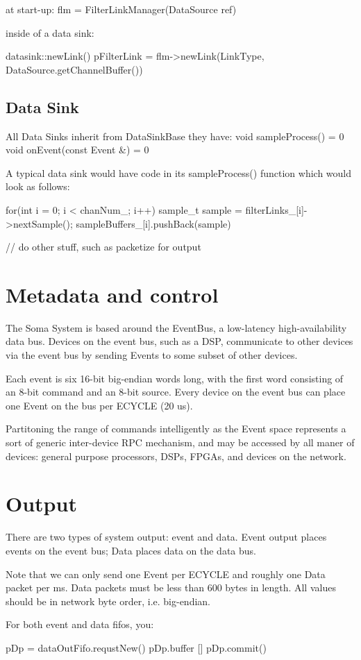 at start-up:
  flm = FilterLinkManager(DataSource ref) 
  
inside of a data sink: 

datasink::newLink()
   pFilterLink = flm->newLink(LinkType, DataSource.getChannelBuffer())


\subsection{Data Sink}
All Data Sinks inherit from DataSinkBase
they have: 
  void sampleProcess() = 0 
  void onEvent(const Event &) = 0


A typical data sink would have code in its sampleProcess() function
which would look as follows:

for(int i = 0; i < chanNum_; i++) {
   sample_t sample = filterLinks_[i]->nextSample(); 
   sampleBuffers_[i].pushBack(sample)
}

// do other stuff, such as packetize for output


\section{Metadata and control}
The Soma System is based around the EventBus, a low-latency
high-availability data bus. Devices on the event bus, such as a DSP,
communicate to other devices via the event bus by sending Events to
some subset of other devices.

Each event is six 16-bit big-endian words long, with the first word
consisting of an 8-bit command and an 8-bit source. Every device on
the event bus can place one Event on the bus per ECYCLE (20 us).

Partitoning the range of commands intelligently as the Event space
represents a sort of generic inter-device RPC mechanism, and may be
accessed by all maner of devices: general purpose processors, DSPs,
FPGAs, and devices on the network.


\section{Output} 
There are two types of system output: event and data. Event output
places events on the event bus; Data places data on the data bus.

Note that we can only send one Event per ECYCLE and roughly one Data
packet per ms. Data packets must be less than 600 bytes in length. All
values should be in network byte order, i.e. big-endian. 

For both event and data fifos, you: 

pDp = dataOutFifo.requstNew()
pDp.buffer []
pDp.commit()
